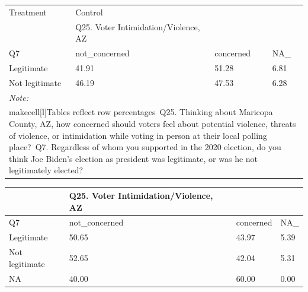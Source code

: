 \documentclass[
  11pt,
  a4paper,
]{article}
\begin{document}
\begin{table}
\centering
\centering
\begin{tabular}[t]{l|l|l|l}
\hline
\multicolumn{1}{l|}{Treatment} & \multicolumn{1}{l}{Control} \\
\cline{1-1} \cline{2-2}
 & Q25. Voter Intimidation/Violence, AZ &  & \\
\hline
Q7 & not\_concerned & concerned & NA\_\\
\hline
Legitimate & 41.91 & 51.28 & 6.81\\
\hline
Not legitimate & 46.19 & 47.53 & 6.28\\
\hline
\multicolumn{4}{l}{\rule{0pt}{1em}\textit{Note: }}\\
\multicolumn{4}{l}{\rule{0pt}{1em}makecell[l]{Tables reflect row percentages\ Q25. Thinking about Maricopa County, AZ, how concerned should voters feel about potential violence, threats of violence, or intimidation while voting in person at their local polling place?\ Q7. Regardless of whom you supported in the 2020 election, do you think Joe Biden's election as president was legitimate, or was he not legitimately elected?}}\\
\end{tabular}
\centering
\begin{tabular}[t]{l|l|l|l}
\hline
 & Q25. Voter Intimidation/Violence, AZ &  & \\
\hline
Q7 & not\_concerned & concerned & NA\_\\
\hline
Legitimate & 50.65 & 43.97 & 5.39\\
\hline
Not legitimate & 52.65 & 42.04 & 5.31\\
\hline
NA & 40.00 & 60.00 & 0.00\\
\hline
\end{tabular}
\end{table}
\end{document}
